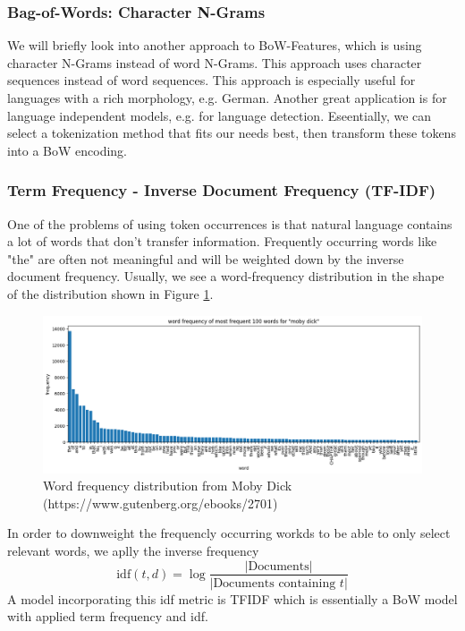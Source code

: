 \documentclass[a4paper]{article}
\begin{document}
\subsubsection{Bag-of-Words: Character N-Grams}
We will briefly look into another approach to BoW-Features, which is using character N-Grams instead of word N-Grams.
This approach uses character sequences instead of word sequences. This approach is especially useful for languages with a rich morphology, e.g. German.
Another great application is for language independent models, e.g. for language detection.
Eseentially, we can select a tokenization method that fits our needs best, then transform these tokens into a BoW encoding.

\subsubsection{Term Frequency - Inverse Document Frequency (TF-IDF)}
One of the problems of using token occurrences is that natural language contains a lot of words that don't transfer information.
Frequently occurring words like "the" are often not meaningful and will be weighted down by the inverse document frequency.
Usually, we see a word-frequency distribution in the shape of the distribution shown in Figure \ref{fig:word-freq-dist}.

\begin{figure}[h]
  \centering
  \includegraphics[width=.95\textwidth]{images/word-distribution.png}
  \caption{Word frequency distribution from Moby Dick (https://www.gutenberg.org/ebooks/2701)}
  \label{fig:word-freq-dist}
\end{figure}
In order to downweight the frequencly occurring workds to be able to only select relevant words, we aplly the inverse
frequency
\begin{equation}
  \text{idf}(t, d) = \log \frac{|\text{Documents}|}{|\text{Documents containing } t|}
  \label{eq:TF-IDF}
\end{equation}
A model incorporating this idf metric is TFIDF which is essentially a BoW model with applied term frequency and idf.
\end{document}
